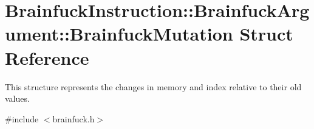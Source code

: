 \hypertarget{structBrainfuckInstruction_1_1BrainfuckArgument_1_1BrainfuckMutation}{}\section{Brainfuck\+Instruction\+:\+:Brainfuck\+Argument\+:\+:Brainfuck\+Mutation Struct Reference}
\label{structBrainfuckInstruction_1_1BrainfuckArgument_1_1BrainfuckMutation}


This structure represents the changes in memory and index relative to their old values.  




{\ttfamily \#include $<$brainfuck.\+h$>$}

